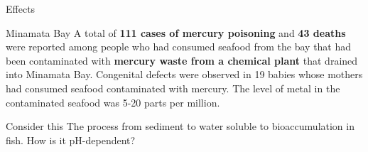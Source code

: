 \documentclass[a4paper,titlepage]{article}
\begin{document}
\begin{frame}{Effects}
{\begin{exampleblock}{Minamata Bay}
\medskip A total of \textbf{111 cases of mercury poisoning} and
\textbf{43 deaths} were reported among people who had consumed seafood from the bay that
had been contaminated with \textbf{mercury waste from a chemical plant} that drained into
Minamata Bay. Congenital defects were observed in 19 babies whose mothers had
consumed seafood contaminated with mercury. The level of metal in the contaminated
seafood was 5-20 parts per million.

\end{exampleblock}
}
\end{frame}

\begin{frame}{Consider this}
The process from sediment to water soluble to bioaccumulation in fish.
How is it pH-dependent?
\end{frame}
\end{document}
